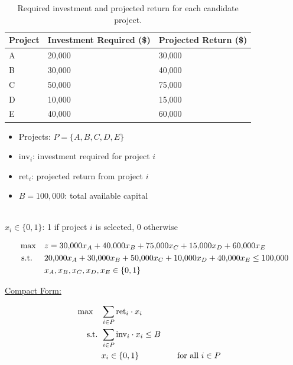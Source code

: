 \begin{table}[h!] \begin{center} \begin{tabular} {|l|l|l|} 
\hline Project & Investment Required (\$) & Projected Return (\$)  \\ \hline
\hline  A & 20,000 & 30,000  \\
\hline  B & 30,000 & 40,000  \\
\hline  C & 50,000 & 75,000  \\
\hline  D & 10,000 & 15,000  \\
\hline  E & 40,000 & 60,000  \\
\hline \end{tabular} \end{center} \caption{Required investment and projected return for each candidate project.}\label{tab:modeling-linear-programming-tab05}%
\end{table}

\begin{solution}

\smallskip {}
\begin{itemize}
\item Projects: \( P = \{A, B, C, D, E\} \)
\end{itemize}

\smallskip {}
\begin{itemize}
\item \( \text{inv}_i \): investment required for project \( i \)
\item \( \text{ret}_i \): projected return from project \( i \)
\item \( B = 100{,}000 \): total available capital
\end{itemize}

\smallskip {} \\
\( x_i \in \{0,1\} \): 1 if project \( i \) is selected, 0 otherwise

\smallskip {}
\begin{align*}
\max \quad & z = 30{,}000x_A + 40{,}000x_B + 75{,}000x_C + 15{,}000x_D + 60{,}000x_E \\
\mbox{ s.t. } \quad 
& 20{,}000x_A + 30{,}000x_B + 50{,}000x_C + 10{,}000x_D + 40{,}000x_E \le 100{,}000 \\
& x_A, x_B, x_C, x_D, x_E \in \{0,1\}
\end{align*}

\smallskip \underline{Compact Form:}

\begin{align*}
\max \quad & \sum_{i \in P} \mbox{ret}_i \cdot x_i \\
\mbox{ s.t. }        & \sum_{i \in P} \mbox{inv}_i \cdot x_i \le B \\
& x_i \in \{0,1\} &&\quad \mbox{for all } i \in P
\end{align*}

\end{solution}


